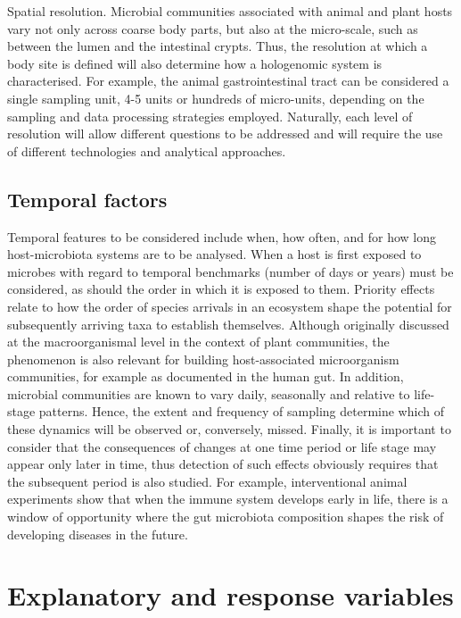 \documentclass[
]{book}
\begin{document}
Spatial resolution. Microbial communities associated with animal and plant hosts vary not only across coarse body parts, but also at the micro-scale, such as between the lumen and the intestinal crypts. Thus, the resolution at which a body site is defined will also determine how a hologenomic system is characterised. For example, the animal gastrointestinal tract can be considered a single sampling unit, 4-5 units or hundreds of micro-units, depending on the sampling and data processing strategies employed. Naturally, each level of resolution will allow different questions to be addressed and will require the use of different technologies and analytical approaches.

\hypertarget{temporal-factors}{%
\subsection*{Temporal factors}\label{temporal-factors}}

Temporal features to be considered include when, how often, and for how long host-microbiota systems are to be analysed. When a host is first exposed to microbes with regard to temporal benchmarks (number of days or years) must be considered, as should the order in which it is exposed to them. Priority effects relate to how the order of species arrivals in an ecosystem shape the potential for subsequently arriving taxa to establish themselves. Although originally discussed at the macroorganismal level in the context of plant communities, the phenomenon is also relevant for building host-associated microorganism communities, for example as documented in the human gut. In addition, microbial communities are known to vary daily, seasonally and relative to life-stage patterns. Hence, the extent and frequency of sampling determine which of these dynamics will be observed or, conversely, missed. Finally, it is important to consider that the consequences of changes at one time period or life stage may appear only later in time, thus detection of such effects obviously requires that the subsequent period is also studied. For example, interventional animal experiments show that when the immune system develops early in life, there is a window of opportunity where the gut microbiota composition shapes the risk of developing diseases in the future.

\hypertarget{explanatory-and-response-variables}{%
\section{Explanatory and response variables}\label{explanatory-and-response-variables}}
\end{document}
